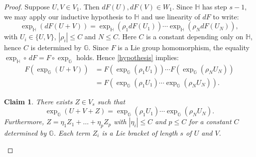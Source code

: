 \documentclass[reqno, 11pt]{amsart}
\newtheorem{claim}[theorem]{Claim}
\theoremstyle{definition}
\theoremstyle{remark}
\numberwithin{theorem}{section}
\numberwithin{equation}{section}
\begin{document}
\begin{proof}
Suppose $U, V\in V_{1}$. Then $dF(U), dF(V)\in W_{1}$. Since $\mathbb{H}$ has step $s-1$, we may apply our inductive hypothesis to $\mathbb{H}$ and use linearity of $dF$ to write:
\begin{equation}\label{hypothesis} \exp_{\mathbb{H}}(dF(U+V))=\exp_{\mathbb{H}}(\rho_{1}dF(U_1))\cdots \exp_{\mathbb{H}}(\rho_{N}dF(U_N)),\end{equation}
with $U_{i}\in \{ U, V\}$, $|\rho_{i}|\leq C$ and $N\leq C$. Here $C$ is a constant depending only on $\mathbb{H}$, hence $C$ is determined by $\mathbb{G}$. Since $F$ is a Lie group homomorphism, the equality $\exp_{\mathbb{H}}\circ \, dF = F\circ \exp_{\mathbb{G}}$ holds. Hence \eqref{hypothesis} implies:
\begin{align}
F(\exp_{\mathbb{G}}(U+V))&=F(\exp_{\mathbb{G}}(\rho_{1}U_1))\cdots F(\exp_{\mathbb{G}}(\rho_{N}U_N))\nonumber \\
&=F(  \exp_{\mathbb{G}}(\rho_{1}U_1)\cdots \exp_{\mathbb{G}}(\rho_{N}U_N)).\label{touse1}
\end{align}

\begin{claim}\label{formforZ}
There exists $Z\in V_{s}$ such that
\begin{equation}\label{someZ}  \exp_{\mathbb{G}}(U+V+Z) = \exp_{\mathbb{G}}(\rho_{1}U_1)\cdots \exp_{\mathbb{G}}(\rho_{N}U_N).\end{equation}
Furthermore, $Z=\eta_{1}Z_{1}+ \ldots +\eta_{p}Z_{p}$ with $|\eta_{i}|\leq C$ and $p\leq C$ for a constant $C$ determined by $\mathbb{G}$. Each term $Z_{i}$ is a Lie bracket of length $s$ of $U$ and $V$.
\end{claim}


\end{proof}
\end{document}
